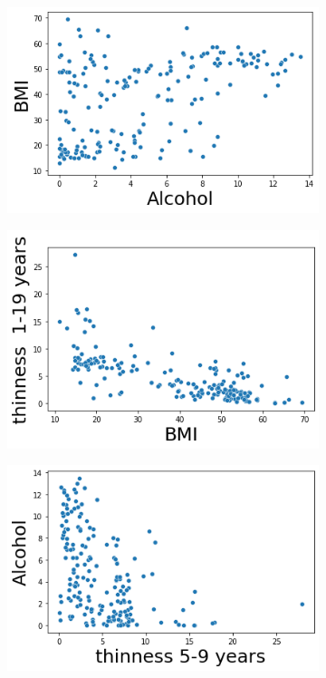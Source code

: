 \begin{itemize}
    \begin{figure}[H]
              \centering
              \begin{subfigure}{0.2\linewidth}
                \centering
                \includegraphics[width=\textwidth]{img/22.png}
              \end{subfigure}
              \hfill
                \begin{subfigure}{0.2\linewidth}
                \centering
                \includegraphics[width=\textwidth]{img/27.png}
              \end{subfigure}
                \hfill
                \begin{subfigure}{0.2\linewidth}
                \centering
                \includegraphics[width=\textwidth]{img/28.png}

\end{subfigure}
\end{figure}
\end{itemize}
